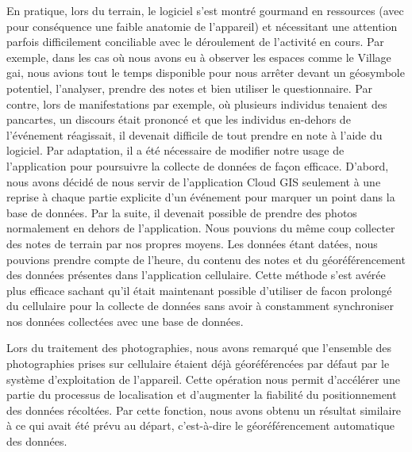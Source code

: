En pratique, lors du terrain, le logiciel s'est montré gourmand en ressources (avec pour conséquence une faible anatomie de l'appareil) et nécessitant une attention parfois difficilement conciliable avec le déroulement de l'activité en cours. 
Par exemple, dans les cas où nous avons eu à observer les espaces comme le Village gai, nous avions tout le temps disponible pour nous arrêter devant un géosymbole potentiel, l'analyser, prendre des notes et bien utiliser le questionnaire. 
Par contre, lors de manifestations par exemple, où plusieurs individus tenaient des pancartes, un discours était prononcé et que les individus en-dehors de l'événement réagissait, il devenait difficile de tout prendre en note à l'aide du logiciel. 
Par adaptation, il a été nécessaire de modifier notre usage de l'application pour poursuivre la collecte de données de façon efficace. 
D'abord, nous avons décidé de nous servir de l'application Cloud GIS seulement à une reprise à chaque partie explicite d'un événement pour marquer un point dans la base de données. 
Par la suite, il devenait possible de prendre des photos normalement en dehors de l'application. 
Nous pouvions du même coup collecter des notes de terrain par nos propres moyens.
Les données étant datées, nous pouvions prendre compte de l'heure, du contenu des notes et du géoréférencement des données présentes dans l'application cellulaire. 
Cette méthode s'est avérée plus efficace sachant qu'il était maintenant possible d'utiliser de facon prolongé du cellulaire pour la collecte de données sans avoir à constamment synchroniser nos données collectées avec une base de données.

Lors du traitement des photographies, nous avons remarqué que l'ensemble des photographies prises sur cellulaire étaient déjà géoréférencées par défaut par le système d'exploitation de l'appareil. 
Cette opération nous permit d'accélérer une partie du processus de localisation et d'augmenter la fiabilité du positionnement des données récoltées. 
Par cette fonction, nous avons obtenu un résultat similaire à ce qui avait été prévu au départ, c'est-à-dire le géoréférencement automatique des données. 

